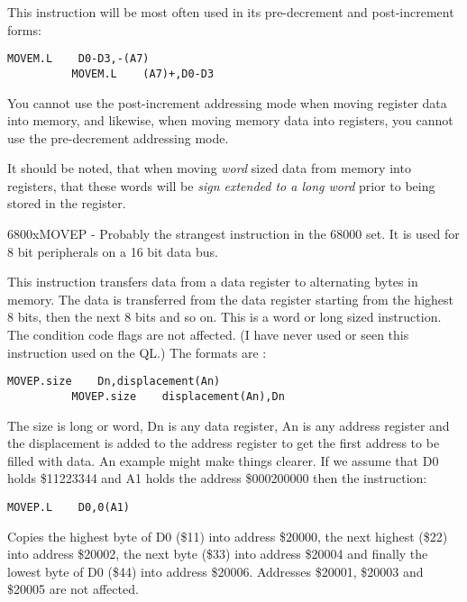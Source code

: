 This instruction will be most often used in its pre-{}decrement and
    post-{}increment forms:

\begin{lstlisting}[firstnumber=1,]
          MOVEM.L    D0-D3,-(A7) 
          MOVEM.L    (A7)+,D0-D3
\end{lstlisting}

You cannot use the post-increment addressing mode when moving register data into memory, and likewise, when moving memory data into registers, you cannot use the pre-decrement addressing mode.

\begin{warning}
It should be noted, that when moving \emph{word} sized data from memory into registers, that these words will be \emph{sign extended to a long word} prior to being stored in the register.
\end{warning}


\mc6800x{MOVEP} -{} Probably the strangest instruction in the 68000 set. It is used for 8 bit peripherals on a 16 bit data bus.

This
    instruction transfers data from a data register to alternating bytes in
    memory. The data is transferred from the data register starting from the
    highest 8 bits, then the next 8 bits and so on. This is a word or long
    sized instruction. The condition code flags are not affected. (I have
    never used or seen this instruction used on the QL.) The formats are
   :

\begin{lstlisting}[firstnumber=1,]
          MOVEP.size    Dn,displacement(An)
          MOVEP.size    displacement(An),Dn
\end{lstlisting}

The size is long or word, Dn is any data register, An is any address
    register and the displacement is added to the address register to get the
    first address to be filled with data. An example might make things
    clearer. If we assume that D0 holds \$11223344 and A1 holds the address
    \$000200000 then the instruction:

\begin{lstlisting}[firstnumber=1,]
          MOVEP.L    D0,0(A1)
\end{lstlisting}

Copies the highest byte of D0 (\$11) into address \$20000, the next
    highest (\$22) into address \$20002, the next byte (\$33) into address \$20004
    and finally the lowest byte of D0 (\$44) into address \$20006. Addresses
    \$20001, \$20003 and \$20005 are not affected.

